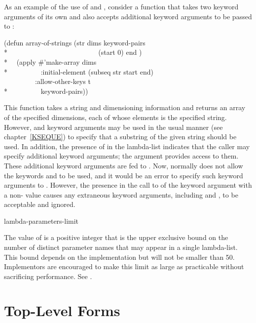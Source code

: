 As an example of the use of  and ,
consider a function that takes two keyword arguments of its own and also
accepts additional keyword arguments to be passed to :
\begin{lisp}
(defun array-of-strings (str dims  keyword-pairs \\*
~~~~~~~~~~~~~~~~~~~~~~~~~ (start 0) end ) \\*
~~(apply \#'make-array dims \\*
~~~~~~~~~:initial-element (subseq str start end) \\
~~~~~~~~~:allow-other-keys t \\*
~~~~~~~~~keyword-pairs))
\end{lisp}

This function takes a string and dimensioning information and returns
an array of the specified dimensions, each of whose elements is the
specified string.  However,  and  keyword arguments
may be used in the usual manner (see chapter~\ref{KSEQUE}) to specify
that a substring of the given string should be used.  In addition,
the presence of  in the lambda-list indicates that the caller
may specify additional keyword arguments; the  argument provides
access to them.  These additional keyword arguments are fed to .
Now,  normally does not allow the keywords 
and  to be used, and it would be an error to specify such
keyword arguments to .  However, the presence in the
call to  of the keyword argument 
with a non-{\false} value causes any extraneous keyword arguments,
including  and , to be acceptable and ignored.

\begin{defun}[Constant]
lambda-parameters-limit

The value of  is a positive integer that is
the upper exclusive bound on the number of distinct parameter names
that may appear in a single lambda-list.
This bound depends on the implementation
but will not be smaller than 50.
Implementors are encouraged to make this limit as large as practicable
without sacrificing performance.
See .
\end{defun}

\section{Top-Level Forms}

